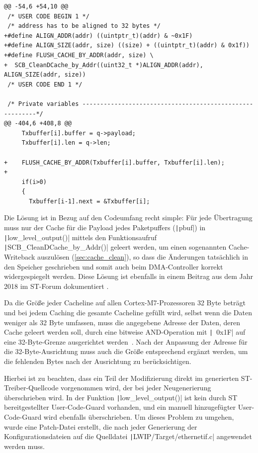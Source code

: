 \begin{code}
\begin{verbatim}
@@ -54,6 +54,10 @@
 /* USER CODE BEGIN 1 */
 /* address has to be aligned to 32 bytes */
+#define ALIGN_ADDR(addr) ((uintptr_t)(addr) & ~0x1F)
+#define ALIGN_SIZE(addr, size) ((size) + ((uintptr_t)(addr) & 0x1f))
+#define FLUSH_CACHE_BY_ADDR(addr, size) \
+  SCB_CleanDCache_by_Addr((uint32_t *)ALIGN_ADDR(addr), ALIGN_SIZE(addr, size))
 /* USER CODE END 1 */
 
 /* Private variables ---------------------------------------------------------*/
@@ -404,6 +408,8 @@
     Txbuffer[i].buffer = q->payload;
     Txbuffer[i].len = q->len;
 
+    FLUSH_CACHE_BY_ADDR(Txbuffer[i].buffer, Txbuffer[i].len);
+
     if(i>0)
     {
       Txbuffer[i-1].next = &Txbuffer[i];
\end{verbatim}
\end{code}

Die Lösung ist in Bezug auf den Codeumfang recht simple: Für jede Übertragung
muss nur der Cache für die Payload jedes Paketpuffers (\texttt|pbuf|)
in \texttt|low_level_output()| mittels den Funktionsaufruf
\texttt|SCB_CleanDCache_by_Addr()| geleert werden, um einen sogenannten
Cache-Writeback auszulösen (\ref{sec:cache_clean}), so dass die Änderungen
tatsächlich in den Speicher geschrieben und somit auch beim DMA-Controller
korrekt widergespiegelt werden. Diese Lösung ist ebenfalls in einem Beitrag aus
dem Jahr 2018 im ST-Forum dokumentiert \cite{ST_Forum_Post_2018}.

Da die Größe jeder Cacheline auf allen Cortex-M7-Prozessoren 32 Byte beträgt
~\cite[S. 4]{an4839} und bei jedem Caching die gesamte Cacheline gefüllt wird,
selbst wenn die Daten weniger als 32 Byte umfassen, muss die angegebene Adresse
der Daten, deren Cache geleert werden soll, durch eine bitweise AND-Operation
mit \texttt|~0x1F| auf eine 32-Byte-Grenze ausgerichtet
werden~\cite{CMSIS_Core_CacheFunctions}. Nach der Anpassung der Adresse für die
32-Byte-Ausrichtung muss auch die Größe entsprechend ergänzt werden, um die
fehlenden Bytes nach der Ausrichtung zu berücksichtigen.

Hierbei ist zu beachten, dass ein Teil der Modifizierung direkt im generierten
ST-Treiber-Quellcode vorgenommen wird, der bei jeder Neugenerierung
überschrieben wird. In der Funktion \texttt|low_level_output()| ist
kein durch ST bereitgestellter User-Code-Guard vorhanden, und ein manuell
hinzugefügter User-Code-Guard wird ebenfalls überschrieben. Um dieses Problem zu
umgehen, wurde eine Patch-Datei erstellt, die nach jeder Generierung der
Konfigurationsdateien auf die Quelldatei \linebreak
\texttt|LWIP/Target/ethernetif.c| angewendet werden muss.
